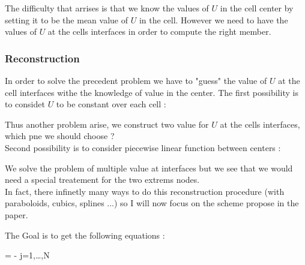 \documentclass[a4paper,12pt]{article}
\begin{document}
The difficulty that arrises is that we know the values of $U$ in the cell center by setting it to be the mean value of $U$ in the cell. However we need to have the values of $U$ at the cells interfaces in order to compute the right member. 

\subsubsection{Reconstruction}
In order to solve the precedent problem we have to "guess" the value of $U$ at the cell interfaces withe the knowledge of value in the center. The first possibility is to considet $U$ to be constant over each cell : 
\begin{figure}[!h]
\centering

\caption{\label{fig:}}
\end{figure}
Thus another problem arise, we construct two value for $U$ at the cells interfaces, which pne we should choose ? \\
Second possibility is to consider piecewise linear function between centers : 
\begin{figure}[!h]
\centering

\caption{\label{fig:}}
\end{figure}
We solve the problem of multiple value at interfaces but we see that we would need a special treatement for the two extrems nodes. \\
\newline
In fact, there infinetly many ways to do this reconstruction procedure (with paraboloids, cubics, splines ...) so I will now focus on the scheme propose in the paper. 

The Goal is to get the following equations : 
\begin{boxeq}
 = - \qquad j=1,\ldots,N
\end{boxeq}
\end{document}
